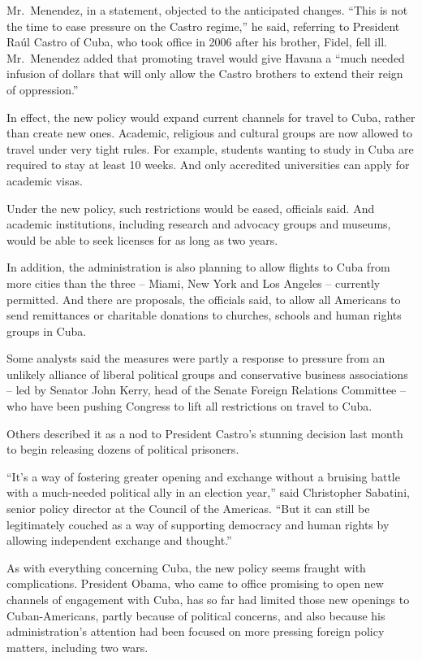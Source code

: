 ﻿\documentclass[12pt]{article}
\begin{document}
Mr.~Menendez, in a statement, objected to the anticipated changes. ``This is not the time to ease
pressure on the Castro regime,'' he said, referring to President Raúl Castro of Cuba, who took
office in 2006 after his brother, Fidel, fell ill. Mr.~Menendez added that promoting travel would
give Havana a ``much needed infusion of dollars that will only allow the Castro brothers to extend
their reign of oppression.''

In effect, the new policy would expand current channels for travel to Cuba, rather than create new
ones. Academic, religious and cultural groups are now allowed to travel under very tight rules. For
example, students wanting to study in Cuba are required to stay at least 10 weeks. And only
accredited universities can apply for academic visas.

Under the new policy, such restrictions would be eased, officials said. And academic institutions,
including research and advocacy groups and museums, would be able to seek licenses for as long as
two years.

In addition, the administration is also planning to allow flights to Cuba from more cities than the
three -- Miami, New York and Los Angeles -- currently permitted. And there are proposals, the
officials said, to allow all Americans to send remittances or charitable donations to churches,
schools and human rights groups in Cuba.

Some analysts said the measures were partly a response to pressure from an unlikely alliance of
liberal political groups and conservative business associations -- led by Senator John Kerry, head
of the Senate Foreign Relations Committee -- who have been pushing Congress to lift all restrictions
on travel to Cuba.

Others described it as a nod to President Castro's stunning decision last month to begin releasing
dozens of political prisoners.

``It's a way of fostering greater opening and exchange without a bruising battle with a much-needed
political ally in an election year,'' said Christopher Sabatini, senior policy director at the
Council of the Americas. ``But it can still be legitimately couched as a way of supporting democracy
and human rights by allowing independent exchange and thought.''

As with everything concerning Cuba, the new policy seems fraught with complications. President
Obama, who came to office promising to open new channels of engagement with Cuba, has so far had
limited those new openings to Cuban-Americans, partly because of political concerns, and also
because his administration's attention had been focused on more pressing foreign policy matters,
including two wars.
\end{document}
